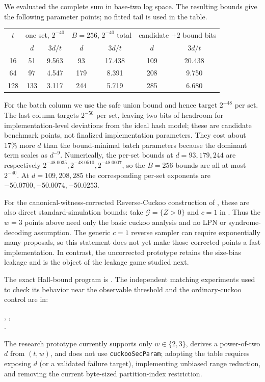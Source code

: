 We evaluated the complete sum in base-two log space.  The resulting bounds
give the following parameter points; no fitted tail is used in the table.

\begin{center}
\begin{tabular}{c|cc|cc|cc}
  $t$ & \multicolumn{2}{c|}{one set, $2^{-40}$}
      & \multicolumn{2}{c|}{$B=256$, $2^{-40}$ total}
      & \multicolumn{2}{c}{candidate $+2$ bound bits} \\
  & $d$ & $3d/t$ & $d$ & $3d/t$ & $d$ & $3d/t$ \\ \hline
  16  & 51  & 9.563 & 93  & 17.438 & 109 & 20.438 \\
  64  & 97  & 4.547 & 179 & 8.391  & 208 & 9.750  \\
  128 & 133 & 3.117 & 244 & 5.719  & 285 & 6.680
\end{tabular}
\end{center}
For the batch column we use the safe union bound and hence target $2^{-48}$
per set.  The last column targets $2^{-50}$ per set, leaving two bits of
headroom for implementation-level deviations from the ideal hash model;
these are candidate benchmark points, not finalized implementation
parameters.  They cost about 17\% more $d$ than the bound-minimal batch
parameters because the dominant term scales as $d^{-9}$.  Numerically, the
per-set bounds at $d=93,179,244$ are respectively
$2^{-48.0035},2^{-48.0510},2^{-48.0007}$, so the $B=256$ bounds are all at
most $2^{-40}$.  At $d=109,208,285$ the corresponding per-set exponents are
$-50.0700,-50.0074,-50.0253$.

For the canonical-witness-corrected Reverse-Cuckoo construction of
, these are also direct
standard-simulation bounds: take $\mathcal G=\{Z>0\}$ and $c=1$ in
.  Thus the $w=3$ points above
need only the basic cuckoo analysis and no LPN or syndrome-decoding
assumption.  The generic $c=1$ reverse sampler can require exponentially many
proposals, so this statement does not yet make those corrected points a fast
implementation.  In contrast, the uncorrected prototype retains the
size-bias leakage and is the object of the leakage game studied next.

The exact Hall-bound program is
.  The independent matching experiments
used to check its behavior near the observable threshold and the
ordinary-cuckoo control are in:
\begin{center}
,\quad
{},\\
.
\end{center}
The research prototype currently
supports only $w\in\{2,3\}$, derives a power-of-two $d$ from $(t,w)$, and does
not use \texttt{cuckooSecParam}; adopting the table requires exposing $d$ (or
a validated failure target), implementing unbiased range reduction, and
removing the current byte-sized partition-index restriction.

